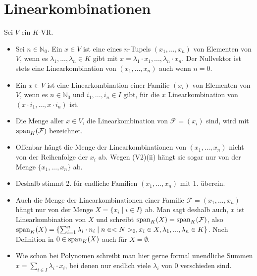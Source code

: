 \section{Linearkombinationen}

Sei $V$ ein $K$-VR.

\begin{definition}[Linearkombination]
	\begin{itemize}
		\item Sei $n \in \mathbb N_0$. Ein $x \in V$ ist eine  eines $n$-Tupels $(x_1,...,x_n)$ von 
		Elementen von $V$, wenn es $\lambda_1,...,\lambda_n \in K$ gibt mit $x=\lambda_1\cdot x_1,...,\lambda_n \cdot
		x_n$. Der Nullvektor ist stets eine Linearkombination von $(x_1,...,x_n)$ auch wenn $n=0$.
		\item Ein $x\in V$ ist eine Linearkombination einer Familie $(x_i)$ von Elementen von $V$, wenn es $n \in \mathbb
		N_0$ und $i_1,...,i_n \in I$ gibt, für die $x$ Linearkombination von $(x\cdot i_1,...,x\cdot i_n)$ ist.
		\item Die Menge aller $x \in V$, die Linearkombination von $\mathcal F=(x_i)$ sind, wird mit $\operatorname{span}_K(\mathcal F)$ 
		bezeichnet.
	\end{itemize}
\end{definition}

\begin{remark}
	\begin{itemize}
		\item Offenbar hängt die Menge der Linearkombinationen von $(x_1,...,x_n)$ nicht von der Reihenfolge der $x_i$ ab. 
		Wegen (V2)(ii) hängt sie sogar nur von der Menge $\{x_1,...,x_n\}$ ab.
		\item Deshalb stimmt 2. für endliche Familien $(x_1,...,x_n)$ mit 1. überein.
		\item Auch die Menge der Linearkombinationen einer Familie $\mathcal F=(x_1,...,x_n)$ hängt nur von der Menge $X=
		\{x_i \mid i \in I\}$ ab. Man sagt deshalb auch, $x$ ist Linearkombination von $X$ und schreibt $\operatorname{span}_K(X)=\operatorname{span}_K(
		\mathcal F)$, also $\operatorname{span}_K(X)=\{\sum _{i=1}^n \lambda_i\cdot n_i \mid n \in <N>_0, x_i \in X, \lambda_1,
		...,\lambda_n \in K\}$. Nach Definition in $0 \in \operatorname{span}_K(X)$ auch für $X=\emptyset$.
		\item Wie schon bei Polynomen schreibt man hier gerne formal unendliche Summen $x=\sum_{i \in I} \lambda_i
		\cdot x_i$, bei denen nur endlich viele $\lambda_i$ von 0 verschieden sind.
	\end{itemize}
\end{remark}

